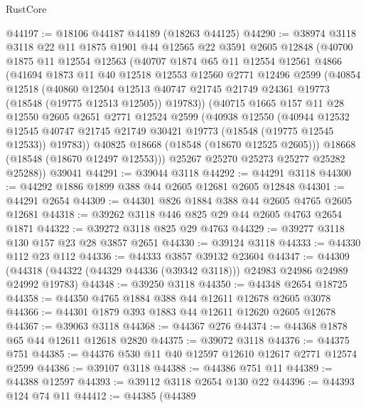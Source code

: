 \begin{lexlean}{RustCore}
\begin{coremodule}
@44197 := @18106 @44187 @44189 (@18263 @44125)
@44290 := @38974
    @3118
    @3118
    @22
    @11
    @1875
    @1901
    @44
    @12565
    @22
    @3591
    @2605
    @12848
    (@40700
      @1875
      @11
      @12554
      @12563
      (@40707
        @1874
        @65
        @11
        @12554
        @12561
        @4866
        (@41694
          @1873
          @11
          @40
          @12518
          @12553
          @12560
          @2771
          @12496
          @2599
          (@40854
            @12518
            (@40860
              @12504
              @12513
              @40747
              @21745
              @21749
              @24361
              @19773
              (@18548 (@19775 @12513 @12505))
              @19783))
          (@40715
            @1665
            @157
            @11
            @28
            @12550
            @2605
            @2651
            @2771
            @12524
            @2599
            (@40938
              @12550
              (@40944
                @12532
                @12545
                @40747
                @21745
                @21749
                @30421
                @19773
                (@18548 (@19775 @12545 @12533))
                @19783))
            @40825
            @18668
            (@18548 (@18670 @12525 @2605)))
          @18668
          (@18548 (@18670 @12497 @12553)))
        @25267
        @25270
        @25273
        @25277
        @25282
        @25288))
    @39041
@44291 := @39044 @3118
@44292 := @44291 @3118
@44300 := @44292 @1886 @1899 @388 @44 @2605 @12681 @2605 @12848
@44301 := @44291 @2654
@44309 := @44301 @826 @1884 @388 @44 @2605 @4765 @2605 @12681
@44318 := @39262 @3118 @446 @825 @29 @44 @2605 @4763 @2654 @1871
@44322 := @39272 @3118 @825 @29 @4763
@44329 := @39277 @3118 @130 @157 @23 @28 @3857 @2651
@44330 := @39124 @3118
@44333 := @44330 @112 @23 @112
@44336 := @44333 @3857 @39132 @23604
@44347 := @44309 (@44318 (@44322 (@44329 @44336 (@39342 @3118))) @24983 @24986 @24989 @24992 @19783)
@44348 := @39250 @3118
@44350 := @44348 @2654 @18725
@44358 := @44350 @4765 @1884 @388 @44 @12611 @12678 @2605 @3078
@44366 := @44301 @1879 @393 @1883 @44 @12611 @12620 @2605 @12678
@44367 := @39063 @3118
@44368 := @44367 @276
@44374 := @44368 @1878 @65 @44 @12611 @12618 @2820
@44375 := @39072 @3118
@44376 := @44375 @751
@44385 := @44376 @530 @11 @40 @12597 @12610 @12617 @2771 @12574 @2599
@44386 := @39107 @3118
@44388 := @44386 @751 @11
@44389 := @44388 @12597
@44393 := @39112 @3118 @2654 @130 @22
@44396 := @44393 @124 @74 @11
@44412 := @44385
    (@44389

\end{coremodule}
\end{lexlean}
